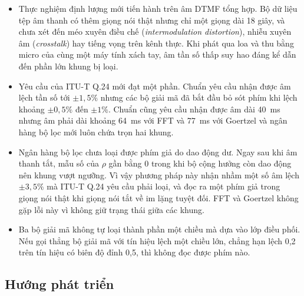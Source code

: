 \documentclass{dtmf_report}
\begin{document}
\begin{itemize}
  \item Thực nghiệm định lượng mới tiến hành trên âm DTMF tổng hợp. Bộ dữ liệu tệp
        âm thanh có thêm giọng nói thật nhưng chỉ một giọng dài 18 giây, và chưa xét
        đến méo xuyên điều chế (\emph{intermodulation distortion}), nhiễu xuyên âm
        (\emph{crosstalk}) hay tiếng vọng trên kênh thực. Khi phát qua loa và thu bằng
        micro của cùng một máy tính xách tay, âm tần số thấp suy hao đáng kể dẫn đến
        phần lớn khung bị loại.
  \item Yêu cầu của \mbox{ITU-T} Q.24 mới đạt một phần. Chuẩn yêu cầu nhận được âm lệch
        tần số tới $\pm 1{,}5\%$ nhưng các bộ giải mã đã bắt đầu bỏ sót phím khi lệch
        khoảng $\pm 0{,}5\%$ đến $\pm 1\%$. Chuẩn cũng yêu cầu nhận được âm dài 40~ms
        nhưng âm phải dài khoảng 64~ms với FFT và 77~ms với Goertzel và ngân hàng
        bộ lọc mới luôn chứa trọn hai khung.
  \item Ngân hàng bộ lọc chưa loại được phím giả do dao động dư. Ngay sau khi âm thanh tắt,
        mẫu số của $\rho$ gần bằng 0 trong khi bộ cộng hưởng còn dao động nên khung
        vượt ngưỡng. Vì vậy phương pháp này nhận nhầm một số âm lệch $\pm 3{,}5\%$ mà
        \mbox{ITU-T} Q.24 yêu cầu phải loại, và đọc ra một phím giả trong giọng nói thật khi
        giọng nói tắt về im lặng tuyệt đối. FFT và Goertzel không gặp lỗi này vì không
        giữ trạng thái giữa các khung.
  \item Ba bộ giải mã không tự loại thành phần một chiều mà dựa vào lớp điều
        phối. Nếu gọi thẳng bộ giải mã với tín hiệu lệch một chiều lớn, chẳng hạn
        lệch 0,2 trên tín hiệu có biên độ đỉnh 0,5, thì không đọc được phím nào.
\end{itemize}

\subsection{Hướng phát triển}
\label{sub:huong-phat-trien}
\end{document}
